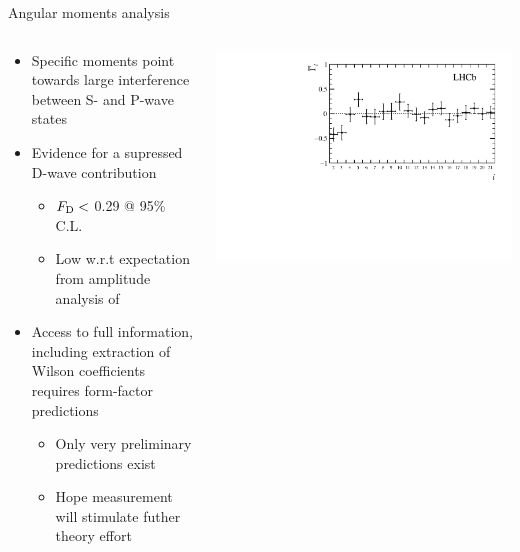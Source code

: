 \documentclass[aspectratio=1610]{beamer}
\begin{document}
\begin{frame}{Angular moments analysis}
\begin{columns}
\begin{column}{0.55\textwidth}
\begin{itemize}
  \item Specific moments point towards large interference between S- and P-wave states 
  \item Evidence for a supressed D-wave contribution
  \begin{itemize}
    \item $F_{\rm D} <$ 0.29 @ 95\% C.L.
    \item Low w.r.t expectation from amplitude analysis of \BdToJPsiKpi%
  \end{itemize}
\end{itemize}
\begin{itemize}
  \item Access to full information, including extraction of Wilson coefficients requires form-factor predictions
  \begin{itemize}
    \item[\ding{70}] Only very preliminary predictions exist 
    \item[\ding{80}] Hope measurement will stimulate futher theory effort
  \end{itemize}
\end{itemize}
\end{column}
\begin{column}{0.45\textwidth}
\centering
\includegraphics[height=0.44\textheight]{figs/kpimm/angular-analysis/mom_results_2_21.pdf}\\

\end{column}
\end{columns}
\end{frame}
\end{document}
